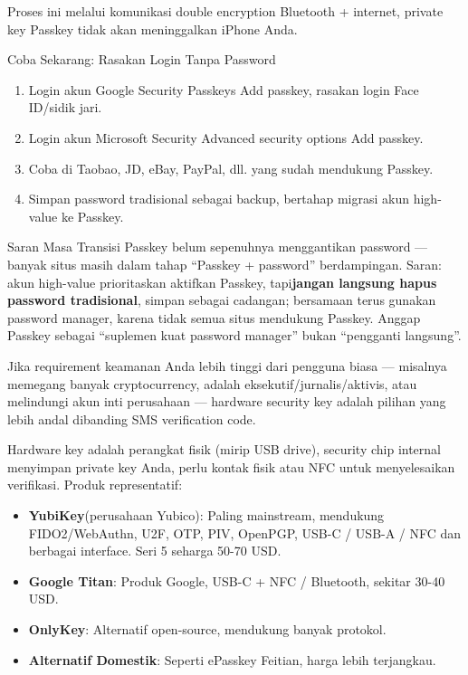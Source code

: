 Proses ini melalui komunikasi double encryption Bluetooth + internet, private key Passkey tidak akan meninggalkan iPhone Anda.

\begin{tcbpractice}{Coba Sekarang: Rasakan Login Tanpa Password}
\begin{enumerate}
  \item Login akun Google Security Passkeys Add passkey, rasakan login Face ID/sidik jari.
  \item Login akun Microsoft Security Advanced security options Add passkey.
  \item Coba di Taobao, JD, eBay, PayPal, dll. yang sudah mendukung Passkey.
  \item Simpan password tradisional sebagai backup, bertahap migrasi akun high-value ke Passkey.
\end{enumerate}

\end{tcbpractice}

\begin{tcbwarn}{Saran Masa Transisi}
Passkey belum sepenuhnya menggantikan password — banyak situs masih dalam tahap “Passkey + password” berdampingan. Saran: akun high-value prioritaskan aktifkan Passkey, tapi\textbf{jangan langsung hapus password tradisional}, simpan sebagai cadangan; bersamaan terus gunakan password manager, karena tidak semua situs mendukung Passkey. Anggap Passkey sebagai “suplemen kuat password manager” bukan “pengganti langsung”.

\end{tcbwarn}


Jika requirement keamanan Anda lebih tinggi dari pengguna biasa — misalnya memegang banyak cryptocurrency, adalah eksekutif/jurnalis/aktivis, atau melindungi akun inti perusahaan — hardware security key adalah pilihan yang lebih andal dibanding SMS verification code.


Hardware key adalah perangkat fisik (mirip USB drive), security chip internal menyimpan private key Anda, perlu kontak fisik atau NFC untuk menyelesaikan verifikasi. Produk representatif:

\begin{itemize}
  \item \textbf{YubiKey}(perusahaan Yubico): Paling mainstream, mendukung FIDO2/WebAuthn, U2F, OTP, PIV, OpenPGP, USB-C / USB-A / NFC dan berbagai interface. Seri 5 seharga 50-70 USD.
  \item \textbf{Google Titan}: Produk Google, USB-C + NFC / Bluetooth, sekitar 30-40 USD.
  \item \textbf{OnlyKey}: Alternatif open-source, mendukung banyak protokol.
  \item \textbf{Alternatif Domestik}: Seperti ePasskey Feitian, harga lebih terjangkau.
\end{itemize}

